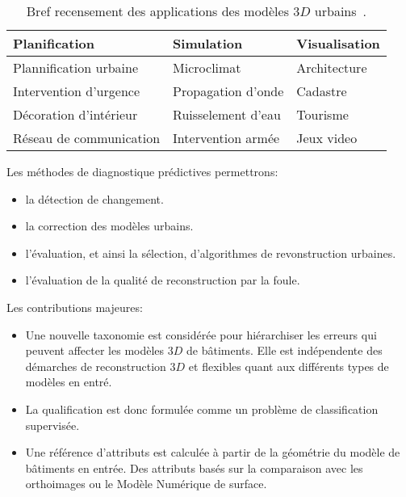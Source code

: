 \documentclass[a4paper,french]{article}
\begin{document}
    \begin{table}[h!]
        \begin{center}
            \begin{tabular}{l l l}
                \toprule
                Planification & Simulation & Visualisation \\
                \midrule
                Plannification urbaine & Microclimat & Architecture \\
                Intervention d'urgence & Propagation d'onde
 & Cadastre \\
                Décoration d'intérieur & Ruisselement d'eau & Tourisme \\
                Réseau de communication & Intervention armée & Jeux video \\
                \bottomrule
            \end{tabular}
            \caption{\label{tab::3d_applications} Bref recensement des applications des modèles $3D$ urbains~\cite{Biljecki2015, Scholze2002}.}
        \end{center}
    \end{table}

    Les méthodes de diagnostique prédictives permettrons:
    \begin{itemize}
        \item la détection de changement.
        \item la correction des modèles urbains.
        \item l'évaluation, et ainsi la sélection, d'algorithmes de revonstruction urbaines.
        \item l'évaluation de la qualité de reconstruction par la foule.
    \end{itemize}

    Les contributions majeures:
    \begin{itemize}
        \item Une nouvelle taxonomie est considérée pour hiérarchiser les erreurs qui peuvent affecter les modèles $3D$ de bâtiments. Elle est indépendente des démarches de reconstruction $3D$ et flexibles quant aux différents types de modèles en entré.
        \item La qualification est donc formulée comme un problème de classification supervisée.
        \item Une référence d'attributs est calculée à partir de la géométrie du modèle de bâtiments en entrée. Des attributs basés sur la comparaison avec les orthoimages ou le Modèle Numérique de surface.
    \end{itemize}
\end{document}
